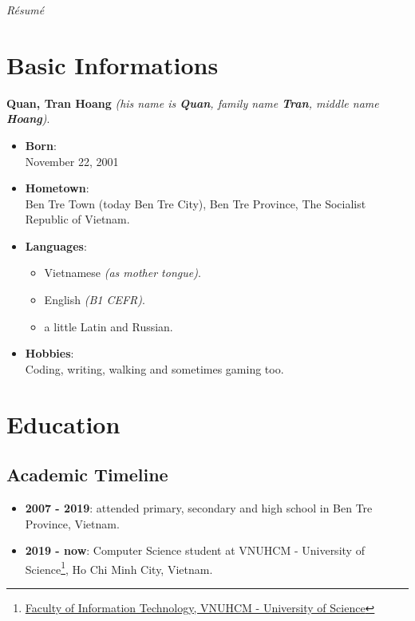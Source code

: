 \documentclass{article}
\renewcommand{\maketitle}{
    \begin{center}
        {\huge\bfseries\theauthor}
        \linebreak\linebreak
        \itshape{R\'esum\'e}
    \end{center}
}
\begin{document}
    \author{Quan, Tran Hoang}
    \maketitle

    \section{Basic Informations}
        {\bfseries Quan, Tran Hoang} {\itshape{(his name is {\bfseries{Quan}}, family name {\bfseries{Tran}}, middle name {\bfseries{Hoang}})}}.
        \begin{itemize}
            \item {\bfseries{Born}}: \\
                November 22, 2001
            \item {\bfseries{Hometown}}: \\
                Ben Tre Town (today Ben Tre City), Ben Tre Province, The Socialist Republic of Vietnam.
            \item {\bfseries{Languages}}:
                \begin{itemize}
                    \item Vietnamese {\itshape{(as mother tongue)}}.
                    \item English {\itshape{(B1 CEFR)}}.
                    \item a little Latin and Russian.
                \end{itemize}
            \item {\bfseries{Hobbies}}: \\
                Coding, writing, walking and sometimes gaming too.
        \end{itemize}

    \section{Education}
        \subsection{Academic Timeline}
            \begin{itemize}
                \item {\bfseries{2007 - 2019}}:
                attended primary, secondary and high school in Ben Tre Province, Vietnam.
                \item {\bfseries{2019 - now}}: Computer Science student at VNUHCM - University of Science\footnote{\href{https://www.fit.hcmus.edu.vn}{Faculty of Information Technology, VNUHCM - University of Science}}, Ho Chi Minh City, Vietnam.
            \end{itemize}
\end{document}
